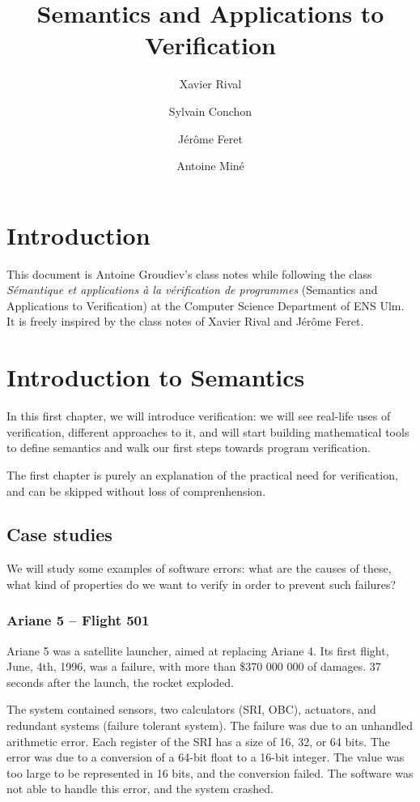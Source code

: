 \documentclass[toc, titlepaged]{../cs-classes/cs-classes}
\author{Xavier Rival\and Sylvain Conchon\and Jérôme Feret\and Antoine Miné}
\title{Semantics and Applications to Verification}
\begin{document}
\section*{Introduction}
This document is Antoine Groudiev's class notes while following the class \emph{Sémantique et applications à la vérification de programmes} (Semantics and Applications to Verification) at the Computer Science Department of ENS Ulm. It is freely inspired by the class notes of Xavier Rival and Jérôme Feret. 

\section{Introduction to Semantics}
In this first chapter, we will introduce verification: we will see real-life uses of verification, different approaches to it, and will start building mathematical tools to define semantics and walk our first steps towards program verification.

The first chapter is purely an explanation of the practical need for verification, and can be skipped without loss of comprenhension.
\subsection{Case studies}
We will study some examples of software errors: what are the causes of these, what kind of properties do we want to verify in order to prevent such failures?
\subsubsection{Ariane 5 -- Flight 501}
Ariane 5 was a satellite launcher, aimed at replacing Ariane 4. Its first flight, June, 4th, 1996, was a failure, with more than \$370 000 000 of damages. 37 seconds after the launch, the rocket exploded. 

The system contained sensors, two calculators (SRI, OBC), actuators, and redundant systems (failure tolerant system). The failure was due to an unhandled arithmetic error. Each register of the  SRI has a size of 16, 32, or 64 bits. The error was due to a conversion of a 64-bit float to a 16-bit integer. The value was too large to be represented in 16 bits, and the conversion failed. The software was not able to handle this error, and the system crashed.
\end{document}
